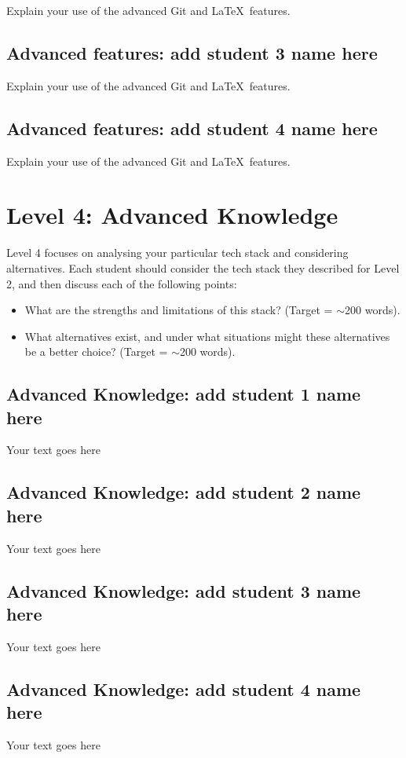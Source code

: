 \documentclass[a4paper, 11pt]{report}
\begin{document}
Explain your use of the advanced Git and \LaTeX\ features. 

\subsection{Advanced features: add student 3 name here}

Explain your use of the advanced Git and \LaTeX\ features. 

\subsection{Advanced features: add student 4 name here}

Explain your use of the advanced Git and \LaTeX\ features. 




\newpage
\section{Level 4: Advanced Knowledge}

Level 4 focuses on analysing your particular tech stack and considering alternatives. Each student should consider the tech stack they described for Level 2, and then discuss each of the following points:
\begin{itemize}
    \item What are the strengths and limitations of this stack? (Target = $\sim$200 words).
    \item What alternatives exist, and under what situations might these alternatives be a better choice? (Target = $\sim$200 words).
\end{itemize}

\subsection{Advanced Knowledge: add student 1 name here}

Your text goes here

\subsection{Advanced Knowledge: add student 2 name here}

Your text goes here

\subsection{Advanced Knowledge: add student 3 name here}

Your text goes here

\subsection{Advanced Knowledge: add student 4 name here}

Your text goes here




\newpage

\printbibliography
\end{document}
